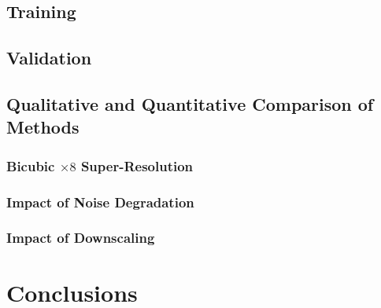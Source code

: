 \documentclass[11pt,a4paper]{article}
\begin{document}
\subsection{Training}

\subsection{Validation}

\subsection{Qualitative and Quantitative Comparison of Methods}

\subsubsection{Bicubic $\times 8$ Super-Resolution}

\subsubsection{Impact of Noise Degradation}

\subsubsection{Impact of Downscaling}

\section{Conclusions}

% 
% 
\end{document}
